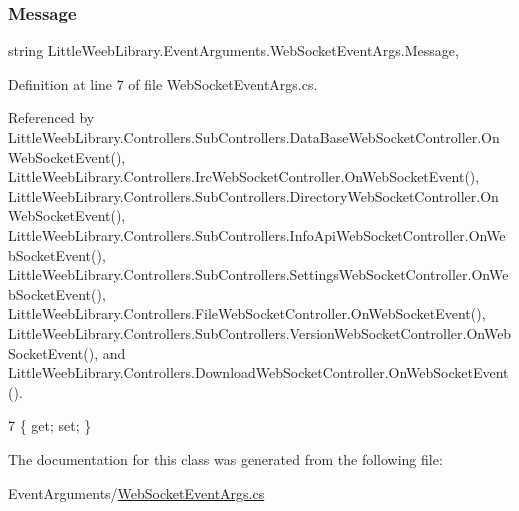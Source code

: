 \subsubsection{\texorpdfstring{Message}{Message}}
{\footnotesize\ttfamily string Little\+Weeb\+Library.\+Event\+Arguments.\+Web\+Socket\+Event\+Args.\+Message\hspace{0.3cm}{\ttfamily [get]}, {\ttfamily [set]}}



Definition at line 7 of file Web\+Socket\+Event\+Args.\+cs.



Referenced by Little\+Weeb\+Library.\+Controllers.\+Sub\+Controllers.\+Data\+Base\+Web\+Socket\+Controller.\+On\+Web\+Socket\+Event(), Little\+Weeb\+Library.\+Controllers.\+Irc\+Web\+Socket\+Controller.\+On\+Web\+Socket\+Event(), Little\+Weeb\+Library.\+Controllers.\+Sub\+Controllers.\+Directory\+Web\+Socket\+Controller.\+On\+Web\+Socket\+Event(), Little\+Weeb\+Library.\+Controllers.\+Sub\+Controllers.\+Info\+Api\+Web\+Socket\+Controller.\+On\+Web\+Socket\+Event(), Little\+Weeb\+Library.\+Controllers.\+Sub\+Controllers.\+Settings\+Web\+Socket\+Controller.\+On\+Web\+Socket\+Event(), Little\+Weeb\+Library.\+Controllers.\+File\+Web\+Socket\+Controller.\+On\+Web\+Socket\+Event(), Little\+Weeb\+Library.\+Controllers.\+Sub\+Controllers.\+Version\+Web\+Socket\+Controller.\+On\+Web\+Socket\+Event(), and Little\+Weeb\+Library.\+Controllers.\+Download\+Web\+Socket\+Controller.\+On\+Web\+Socket\+Event().


\begin{DoxyCode}
7 \{ \textcolor{keyword}{get}; \textcolor{keyword}{set}; \}
\end{DoxyCode}


The documentation for this class was generated from the following file\+:\begin{DoxyCompactItemize}
\item 
Event\+Arguments/\mbox{\hyperlink{_web_socket_event_args_8cs}{Web\+Socket\+Event\+Args.\+cs}}\end{DoxyCompactItemize}
